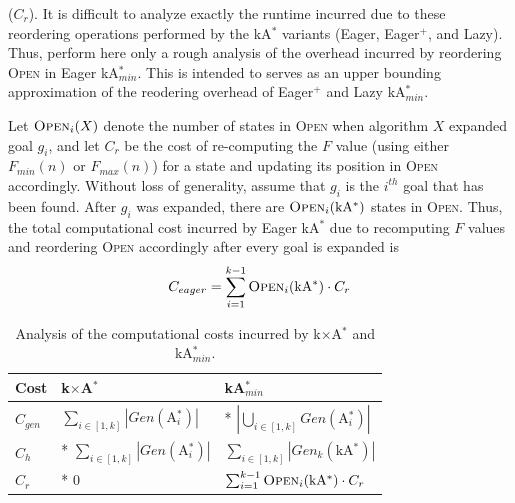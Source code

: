\documentclass{aicom2e}
\newcommand{\kgs}{$k$GP}
\newcommand{\kastar}{kA$^*$}
\newcommand{\kastarmin}{kA$^*_{min}$}
\newcommand{\kxastar}{k$\times$A$^*$}
\newcommand{\astari}[1]{A$^*_#1$}
\newcommand{\minf}{$F_{min}(n)$}
\newcommand{\maxf}{$F_{max}(n)$}
\newcommand{\open}{\textsc{Open}}
\begin{document}




\noindent {\bf Reordering of \open{}} ($C_r$).
It is difficult to analyze exactly the runtime incurred due to these reordering operations performed by the \kastar{} variants (Eager, Eager$^+$, and Lazy). 
Thus, perform here only a rough analysis of the overhead incurred by reordering \open{} in Eager \kastarmin{}. This is intended to serves as an upper bounding approximation of the reodering overhead of Eager$^+$ and Lazy \kastarmin{}. 


Let $\open{}_i(X)$ denote the number of
states in \open{} when algorithm $X$ expanded goal $g_i$, and let $C_r$ be the cost
of re-computing the $F$ value (using either \minf{} or \maxf{}) for a state 
and updating its position in \open{} accordingly. 
Without loss of generality, assume that $g_i$ is the  $i^{th}$ goal that has
been found. After $g_i$ was expanded, there are $\open{}_i(\text{\kastar{}})$ states in \open{}. 
Thus, the total computational cost
incurred by Eager \kastar{} due to recomputing $F$ values and reordering \open{} accordingly 
after every goal is expanded is
\begin{equation}
C_{eager}=\sum_{i=1}^{k-1} \open{}_i(\text{\kastar{}}) \cdot C_r
\label{eq:re-sort-cost}
\end{equation}



\begin{table}
    \begin{tabular}{|l|l|l|}
        \hline
        Cost        & \kxastar{}                                    & \kastarmin \\ \hline
        $C_{gen}$   & $\sum\limits_{i\in[1,k]} |Gen(\text{\astari{i}})|$       & * $|\bigcup\limits_{i\in[1,k]} Gen(\text{\astari{i}})|$\\
        $C_{h}$     & * $\sum\limits_{i\in[1,k]} |Gen(\text{\astari{i}})|$     & $\sum\limits_{i\in[1,k]} |Gen_k(\text{\kastar{}})|$\\
        $C_r$       & *  0                                               & $\sum_{i=1}^{k-1} \open{}_i(\text{\kastar{}}) \cdot C_r$\\
        \hline
    \end{tabular}
       \caption{Analysis of the computational costs incurred by \kxastar{} and \kastarmin{}.}
   \label{tab:time-analysis}
\end{table}
\end{document}
